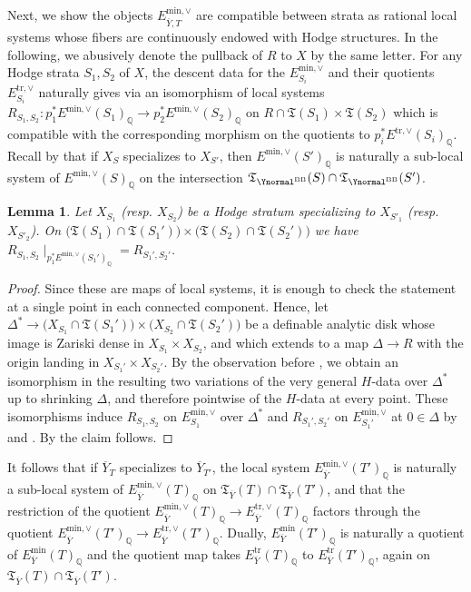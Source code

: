 \documentclass{amsart}
\newcommand{\ol}{\overline}
\newtheorem{lemma}[theorem]{Lemma}
\theoremstyle{definition}
\theoremstyle{remark}
\def\bQ{\mathbb{Q}}
\def\fT{\mathfrak{T}}
\def\trans{\mathrm{tr}}
\def\mini{\mathrm{min}}
\def\BB{\mathrm{BB}}
\def\fT{\mathfrak{T}}
\renewcommand{\bar}[1]{\ol{#1}}
\numberwithin{equation}{section}
\begin{document}
Next, we show the objects $E_{\bar Y,T}^{\mini,\vee}$ are compatible between strata as rational local systems whose fibers are continuously endowed with Hodge structures.
In the following, we abusively denote the pullback of $R$ to $X$ by the same letter.  For any Hodge strata $S_1,S_2$ of $X$, the descent data for the $E^{\mini,\vee}_{S_i}$ and their quotients $E^{\trans,\vee}_{S_i}$ naturally gives via 
an isomorphism of local systems $R_{S_1,S_2}: p_1^*E^{\mini,\vee}(S_1)_\bQ\to p_2^*E^{\mini,\vee}(S_2)_\bQ$ on $R\cap \fT(S_1)\times \fT(S_2)$ which is compatible with the corresponding morphism on the quotients to $p_i^*E^{\trans,\vee}(S_i)_\bQ$.  Recall by  that if $X_{S}$ specializes to $X_{S'}$, then $E^{\mini,\vee}(S')_\bQ$ is naturally a sub-local system of $E^{\mini,\vee}(S)_\bQ$ on the intersection $\fT_{\Ynormal^\BB}(S)\cap \fT_{\Ynormal^\BB}(S')$.

\begin{lemma}\label{lem:descentcompatibility}
Let $X_{S_1}$ (resp. $X_{S_2}$) be a Hodge stratum specializing to $X_{S'_1}$ (resp. $X_{S'_2}$).
On $\big(\mathfrak{T}(S_1)\cap \mathfrak{T}(S_1')\big)\times \big(\mathfrak{T}(S_2)\cap \mathfrak{T}(S_2')\big)$ we have
$R_{S_1,S_2}\mid_{p_1^*E^{\mini,\vee}(S_1')_\bQ}=R_{S_1',S_2'}$.

\end{lemma}

\begin{proof}
Since these are maps of local systems, it is enough to check the statement at a single point in each connected component. Hence, let $\Delta^{*}\to \big(X_{S_1}\cap \mathfrak{T}(S_1')\big)\times \big(X_{S_2}\cap \mathfrak{T}(S_2')\big)$ be a definable analytic disk whose image is Zariski dense in $X_{S_1}\times X_{S_2}$, and which extends to a map $\Delta\to R$ with the origin landing in $X_{S_1'}\times X_{S_2'}$.  By the observation before , we obtain an isomorphism in the resulting two variations of the very general $H$-data over $\Delta^*$ up to shrinking $\Delta$, and therefore pointwise of the $H$-data at every point.  These isomorphisms induce $R_{S_1,S_2}$ on $E^{\mini,\vee}_{S_1}$ over $\Delta^*$ and $R_{S_1',S_2'}$ on $E^{\mini,\vee}_{S_1'}$ at $0\in\Delta$ by  and . By  the claim follows.
\end{proof}

It follows that if $\bar Y_{T}$ specializes to $\bar Y_{T'}$, the local system $E_{\bar Y}^{\mini,\vee}(T')_\bQ$ is naturally a sub-local system of $E_{\bar Y}^{\mini,\vee}(T)_\bQ$ on $\fT_{\bar Y}(T)\cap \fT_{\bar Y}(T')$, and that the restriction of the quotient $E_{\bar Y}^{\mini,\vee}(T)_\bQ\to E_{\bar Y}^{\trans,\vee}(T)_\bQ$ factors through the quotient $E_{\bar Y}^{\mini,\vee}(T')_\bQ\to E_{\bar Y}^{\trans,\vee}(T')_\bQ$.  Dually, $E_{\bar Y}^{\mini}(T')_\bQ$ is naturally a quotient of $E_{\bar Y}^{\mini}(T)_\bQ$ and the quotient map takes $E^\trans_{\bar Y}(T)_\bQ$ to $E^\trans_{\bar Y}(T')_\bQ$, again on $\fT_{\bar Y}(T)\cap \fT_{\bar Y}(T')$.
\end{document}
